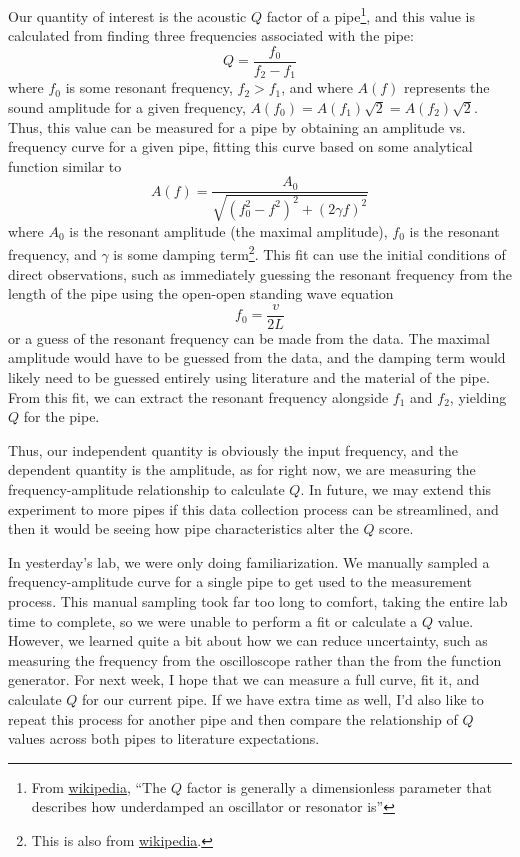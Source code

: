 \documentclass[14pt]{extarticle}
\begin{document}
Our quantity of interest is the acoustic $Q$ factor of a pipe\footnote{From \href{https://en.wikipedia.org/wiki/Q_factor\#Acoustical_systems}{wikipedia}, ``The $Q$ factor is generally a dimensionless parameter that describes how underdamped an oscillator or resonator is''}, and this value is calculated from finding three frequencies associated with the pipe:
\begin{equation}
  Q = \frac{f_0}{f_2 - f_1}
\end{equation}
where $f_0$ is some resonant frequency, $f_2 > f_1$, and where $A(f)$ represents the sound amplitude for a given frequency, $A(f_0) = A(f_1) \sqrt{2} = A(f_2) \sqrt{2}$. Thus, this value can be measured for a pipe by obtaining an amplitude vs. frequency curve for a given pipe, fitting this curve based on some analytical function similar to
\begin{equation}
  A(f) = \frac{A_0}{\sqrt{(f_0^2 - f^2)^2 + (2 \gamma f)^2}}
\end{equation}
where $A_0$ is the resonant amplitude (the maximal amplitude), $f_0$ is the resonant frequency, and $\gamma$ is some damping term\footnote{This is also from \href{https://en.wikipedia.org/wiki/Resonance\#Acoustic}{wikipedia}.}. This fit can use the initial conditions of direct observations, such as immediately guessing the resonant frequency from the length of the pipe using the open-open standing wave equation
\begin{equation}
  f_0 = \frac{v}{2L}
\end{equation}
or a guess of the resonant frequency can be made from the data. The maximal amplitude would have to be guessed from the data, and the damping term would likely need to be guessed entirely using literature and the material of the pipe. From this fit, we can extract the resonant frequency alongside $f_1$ and $f_2$, yielding $Q$ for the pipe.

Thus, our independent quantity is obviously the input frequency, and the dependent quantity is the amplitude, as for right now, we are measuring the frequency-amplitude relationship to calculate $Q$. In future, we may extend this experiment to more pipes if this data collection process can be streamlined, and then it would be seeing how pipe characteristics alter the $Q$ score.

In yesterday's lab, we were only doing familiarization. We manually sampled a  frequency-amplitude curve for a single pipe to get used to the measurement process. This manual sampling took far too long to comfort, taking the entire lab time to complete, so we were unable to perform a fit or calculate a $Q$ value. However, we learned quite a bit about how we can reduce uncertainty, such as measuring the frequency from the oscilloscope rather than the from the function generator. For next week, I hope that we can measure a full curve, fit it, and calculate $Q$ for our current pipe. If we have extra time as well, I'd also like to repeat this process for another pipe and then compare the relationship of $Q$ values across both pipes to literature expectations.
\end{document}
